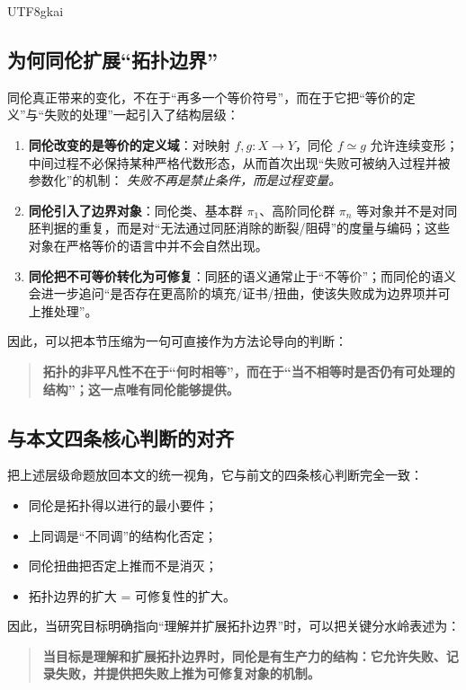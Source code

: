 \documentclass[12pt]{article}
\begin{document}
\begin{CJK*}{UTF8}{gkai}
\subsection{为何同伦扩展“拓扑边界”}

同伦真正带来的变化，不在于“再多一个等价符号”，而在于它把“等价的定义”与“失败的处理”一起引入了结构层级：
\begin{enumerate}
  \item \textbf{同伦改变的是等价的定义域}：对映射 $f,g\colon X\to Y$，同伦 $f\simeq g$ 允许连续变形；中间过程不必保持某种严格代数形态，从而首次出现“失败可被纳入过程并被参数化”的机制：
    \emph{失败不再是禁止条件，而是过程变量。}
  \item \textbf{同伦引入了边界对象}：同伦类、基本群 $\pi_1$、高阶同伦群 $\pi_n$ 等对象并不是对同胚判据的重复，而是对“无法通过同胚消除的断裂/阻碍”的度量与编码；这些对象在严格等价的语言中并不会自然出现。
  \item \textbf{同伦把不可等价转化为可修复}：同胚的语义通常止于“不等价”；而同伦的语义会进一步追问“是否存在更高阶的填充/证书/扭曲，使该失败成为边界项并可上推处理”。
\end{enumerate}

因此，可以把本节压缩为一句可直接作为方法论导向的判断：
\begin{quote}
\textbf{拓扑的非平凡性不在于“何时相等”，而在于“当不相等时是否仍有可处理的结构”；这一点唯有同伦能够提供。}
\end{quote}

\subsection{与本文四条核心判断的对齐}

把上述层级命题放回本文的统一视角，它与前文的四条核心判断完全一致：
\begin{itemize}
  \item 同伦是拓扑得以进行的最小要件；
  \item 上同调是“不同调”的结构化否定；
  \item 同伦扭曲把否定上推而不是消灭；
  \item 拓扑边界的扩大 = 可修复性的扩大。
\end{itemize}

因此，当研究目标明确指向“理解并扩展拓扑边界”时，可以把关键分水岭表述为：
\begin{quote}
\textbf{当目标是理解和扩展拓扑边界时，同伦是有生产力的结构：它允许失败、记录失败，并提供把失败上推为可修复对象的机制。}
\end{quote}



\end{CJK*}
\end{document}
